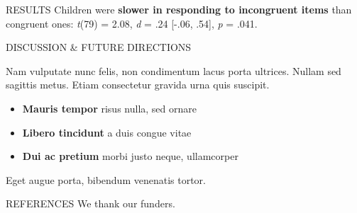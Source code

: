 \documentclass[final]{beamer}
\newlength{\colwidth}
\newlength{\widecolwidth}
\begin{document}
\begin{frame}[t]
\begin{columns}[t]
\begin{column}{\widecolwidth}
\begin{block}{RESULTS}
    Children were \textbf{slower in responding to incongruent items} than congruent ones: \emph{t}(79) = 2.08, \emph{d}  = .24 [-.06, .54], \emph{p} = .041.

  \end{block}
    
      \begin{block}{DISCUSSION \& FUTURE DIRECTIONS}

    Nam vulputate nunc felis, non condimentum lacus porta ultrices. Nullam sed
    sagittis metus. Etiam consectetur gravida urna quis suscipit.

    \begin{itemize}
      \item \textbf{Mauris tempor} risus nulla, sed ornare
      \item \textbf{Libero tincidunt} a duis congue vitae
      \item \textbf{Dui ac pretium} morbi justo neque, ullamcorper
    \end{itemize}

    Eget augue porta, bibendum venenatis tortor.

  \end{block}

  \begin{block}{REFERENCES}
	We thank our funders.
    \nocite{*}
    \footnotesize{}

  \end{block}

\end{column}
\end{columns}
\end{frame}
\end{document}
